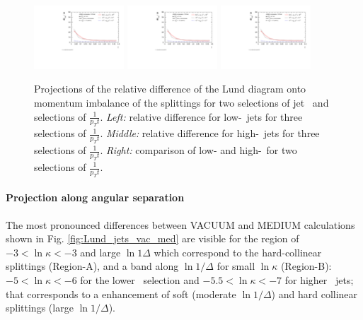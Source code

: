 \begin{figure}[htbp]
	\centering
	\includegraphics[width=0.3\textwidth,page=4]{figures/lund/lund_t_z}
	\includegraphics[width=0.3\textwidth,page=8]{figures/lund/lund_t_z}
	\includegraphics[width=0.3\textwidth,page=9]{figures/lund/lund_t_z}
	\caption{Projections of the relative difference of the Lund diagram onto momentum imbalance of the splittings for two selections of jet \pt\ and selections of $\frac{1}{p_{T} t}$.
	{\it Left:} relative difference for low-\pt\ jets for three selections of $\frac{1}{p_{T} t}$.
	{\it Middle:} relative difference for high-\pt\ jets for three selections of $\frac{1}{p_{T} t}$.
	{\it Right:} comparison of low- and high-\pt\ for two selections of $\frac{1}{p_{T} t}$.
	}
	\label{fig:Lund_projections_z}
\end{figure}

\paragraph{Projection along angular separation}
The most pronounced differences between VACUUM and MEDIUM calculations shown in Fig. \ref{fig:Lund_jets_vac_med} are visible for the region of $-3 < \ln \kappa < -3$ and large $\ln 1\Delta$ which correspond to the hard-collinear splittings (Region-A), and a band along $\ln 1/\Delta$ for small $\ln \kappa$ (Region-B): $-5 < \ln \kappa < -6$ for the lower \pt\ selection and $-5.5 < \ln \kappa < -7$ for higher \pt\ jets; that corresponds to a enhancement of soft (moderate $\ln 1/\Delta$) and hard collinear splittings (large $\ln 1/\Delta$).

